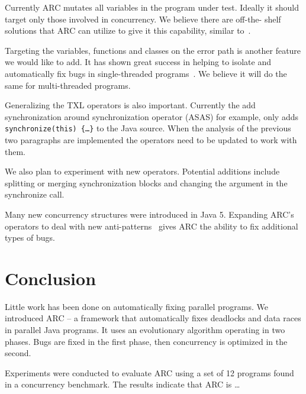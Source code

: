 \documentclass{llncs}
\begin{document}
Currently ARC mutates all variables in the program under test. Ideally it
should target only those involved in concurrency. We believe there are off-the-
shelf solutions that ARC can utilize to give it this capability, similar
to~\cite{CM08, HP00}.

Targeting the variables, functions and classes on the error path is another
feature we would like to add. It has shown great success in helping to isolate
and automatically fix bugs in single-threaded programs~\cite{FNWG09, NWLF09,
WFGN10, GNFW11}. We believe it will do the same for multi-threaded programs.

Generalizing the TXL operators is also important. Currently the add
synchronization around synchronization operator (ASAS) for example, only adds
\texttt{synchronize(this) \{\ldots\}} to the Java source. When the analysis of
the previous two paragraphs are implemented the operators need to be updated to
work with them.

We also plan to experiment with new operators. Potential additions include
splitting or merging synchronization blocks and changing the argument in the
synchronize call.

Many new concurrency structures were introduced in Java 5. Expanding ARC's
operators to deal with new anti-patterns~\cite{BJ09, BCD06} gives ARC the
ability to fix additional types of bugs.

\section{Conclusion}
\label{sec:conclusion}

Little work has been done on automatically fixing parallel programs. We
introduced ARC -- a framework that automatically fixes deadlocks and data races
in parallel Java programs. It uses an evolutionary algorithm operating in two
phases. Bugs are fixed in the first phase, then concurrency is optimized in the
second.

Experiments were conducted to evaluate ARC using a set of 12 programs found in
a concurrency benchmark. The results indicate that ARC is \ldots %



\end{document}
